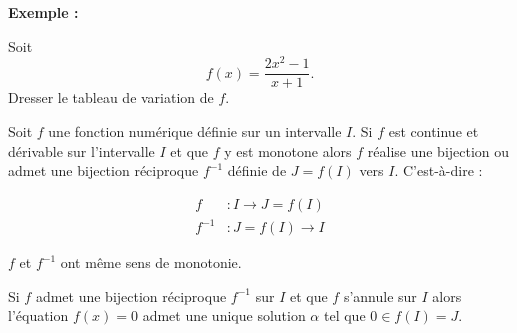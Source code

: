 \documentclass[12pt,a4paper]{article}
\newcounter{solution}
\begin{document}
\textbf{Exemple :}

Soit
\[
f(x)=\dfrac{2x^2-1}{x+1}.
\]
Dresser le tableau de variation de $f$.



\begin{tcolorbox}[
    colback=green!5,
    colframe=green!60!black,
    colbacktitle=green!60!black,
    title=\textbf{3 - Dérivée et bijection},
    fonttitle=\bfseries,
    boxrule=0.8pt
]

Soit $f$ une fonction numérique définie sur un intervalle $I$.
Si $f$ est continue et dérivable sur l'intervalle $I$ et que $f$
y est monotone alors $f$ réalise une bijection ou admet une
bijection réciproque $f^{-1}$ définie de $J=f(I)$ vers $I$.
C'est-à-dire :

\[
\begin{aligned}
f &: I \longrightarrow J=f(I)
\\
f^{-1} &: J=f(I) \longrightarrow I
\end{aligned}
\]

\end{tcolorbox}



\begin{tcolorbox}[
    colback=green!5,
    colframe=green!60!black,
    colbacktitle=green!60!black,
    title=\textbf{Remarque :},
    fonttitle=\bfseries,
    boxrule=0.8pt
]

$f$ et $f^{-1}$ ont même sens de monotonie.

\end{tcolorbox}



\begin{tcolorbox}[
    colback=green!5,
    colframe=green!60!black,
    colbacktitle=green!60!black,
    title=\textbf{Théorème :},
    fonttitle=\bfseries,
    boxrule=0.8pt
]

Si $f$ admet une bijection réciproque $f^{-1}$ sur $I$ et que
$f$ s'annule sur $I$ alors l'équation $f(x)=0$ admet une unique
solution $\alpha$ tel que $0\in f(I)=J$.

\end{tcolorbox}
\end{document}
